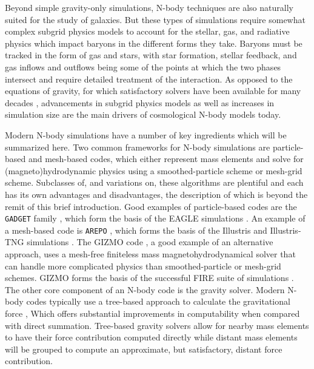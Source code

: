Beyond simple gravity-only simulations, N-body techniques are also naturally suited for the study of galaxies. But these types of simulations require somewhat complex subgrid physics models to account for the stellar, gas, and radiative physics which impact baryons in the different forms they take. Baryons must be tracked in the form of gas and stars, with star formation, stellar feedback, and gas inflows and outflows being some of the points at which the two phases intersect and require detailed treatment of the interaction. As opposed to the equations of gravity, for which satisfactory solvers have been available for many decades \parencite[e.g.][]{barnes86}, advancements in subgrid physics models as well as increases in simulation size are the main drivers of cosmological N-body models today.

Modern N-body simulations have a number of key ingredients which will be summarized here. Two common frameworks for N-body simulations are particle-based and mesh-based codes, which either represent mass elements and solve for (magneto)hydrodynamic physics using a smoothed-particle scheme or mesh-grid scheme. Subclasses of, and variations on, these algorithms are plentiful and each has its own advantages and disadvantages, the description of which is beyond the remit of this brief introduction. Good examples of particle-based codes are the \texttt{GADGET} family \parencite{gadget2_springel05,gadget4_springel21}, which form the basis of the EAGLE simulations \parencite{schaye15}. An example of a mesh-based code is \texttt{AREPO} \parencite{arepo_springel10}, which forms the basis of the Illustris and Illustris-TNG simulations \parencite{illustris_vogelsberger14,tng_model_pillepich18}. The GIZMO code \parencite{gizmo_hopkins15}, a good example of an alternative approach, uses a mesh-free finiteless mass magnetohydrodynamical solver that can handle more complicated physics than smoothed-particle or mesh-grid schemes. GIZMO forms the basis of the successful FIRE suite of simulations \parencite{wetzel16,FIRE2_model_hopkins18}. The other core component of an N-body code is the gravity solver. Modern N-body codes typically use a tree-based approach to calculate the gravitational force \parencite[e.g.][]{barnes86}, Which offers substantial improvements in computability when compared with direct summation. Tree-based gravity solvers allow for nearby mass elements to have their force contribution computed directly while distant mass elements will be grouped to compute an approximate, but satisfactory, distant force contribution.

